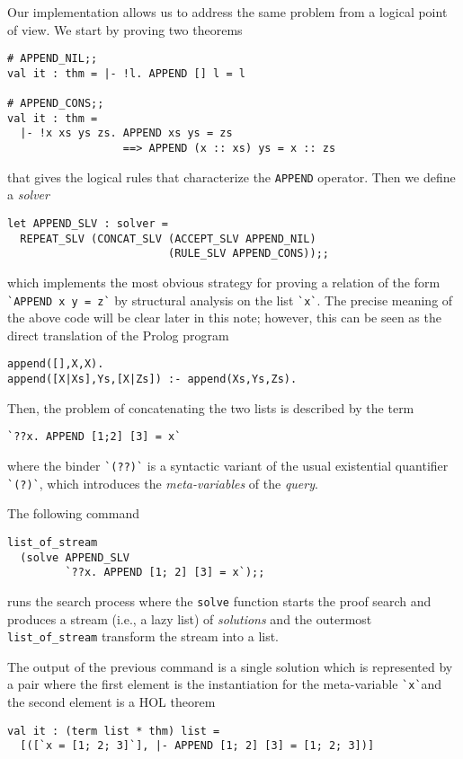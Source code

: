 Our implementation allows us to address the same problem from a
logical point of view.  We start by proving two theorems
\begin{verbatim}
# APPEND_NIL;;
val it : thm = |- !l. APPEND [] l = l

# APPEND_CONS;;
val it : thm =
  |- !x xs ys zs. APPEND xs ys = zs
                  ==> APPEND (x :: xs) ys = x :: zs
\end{verbatim}
that gives the logical rules that characterize the \verb|APPEND|
operator.  Then we define a \emph{solver}
\begin{verbatim}
let APPEND_SLV : solver =
  REPEAT_SLV (CONCAT_SLV (ACCEPT_SLV APPEND_NIL)
                         (RULE_SLV APPEND_CONS));;
\end{verbatim}
which implements the most obvious strategy for proving a relation of
the form \verb|`APPEND x y = z`| by structural analysis on the list
\verb|`x`|.  The precise meaning of the above code will be clear later
in this note; however, this can be seen as the direct translation of
the Prolog program
\begin{verbatim}
append([],X,X).
append([X|Xs],Ys,[X|Zs]) :- append(Xs,Ys,Zs).
\end{verbatim}

Then, the problem of concatenating the two lists is described by the
term
\begin{verbatim}
`??x. APPEND [1;2] [3] = x`
\end{verbatim}
where the binder \verb|`(??)`| is a syntactic variant of the usual
existential quantifier \verb|`(?)`|, which introduces the
\emph{meta-variables} of the \emph{query}.

The following command
\begin{verbatim}
list_of_stream
  (solve APPEND_SLV
         `??x. APPEND [1; 2] [3] = x`);;
\end{verbatim}
runs the search process where the \verb|solve| function starts the
proof search and produces a stream (i.e., a lazy list) of
\emph{solutions} and the outermost \verb|list_of_stream| transform the
stream into a list.

The output of the previous command is a single solution which is
represented by a pair where the first element is the instantiation for
the meta-variable \verb|`x`|and the second element is a HOL theorem
\begin{verbatim}
val it : (term list * thm) list =
  [([`x = [1; 2; 3]`], |- APPEND [1; 2] [3] = [1; 2; 3])]
\end{verbatim}

